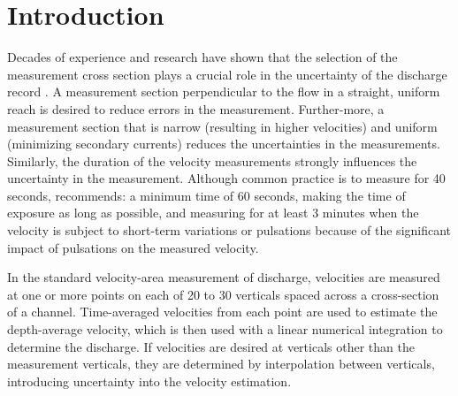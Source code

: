 \documentclass[Journal,letterpaper,BackFigs]{ascelike-new}
\begin{document}
\section{Introduction}
Decades of experience and research have shown that the selection of the measurement cross section plays a crucial role in the uncertainty of the discharge record \cite{Herschy:2009}. A measurement section perpendicular to the flow in a straight, uniform reach is desired to reduce errors in the measurement. Further-more, a measurement section that is narrow (resulting in higher velocities) and uniform (minimizing secondary currents) reduces the uncertainties in the measurements. Similarly, the duration of the velocity measurements strongly influences the uncertainty in the measurement. Although common practice is to measure for 40 seconds,  recommends: a minimum time of 60 seconds, making the time of exposure as long as possible, and measuring for at least 3 minutes when the velocity is subject to short-term variations or pulsations because of the significant impact of pulsations on the measured velocity.

In the standard velocity-area measurement of discharge, velocities are measured at one or more points on each of 20 to 30 verticals spaced across a cross-section of a channel. Time-averaged velocities from each point are used to estimate the depth-average velocity, which is then used with a linear numerical integration to determine the discharge. If velocities are desired at verticals other than the measurement verticals, they are determined by interpolation between verticals, introducing uncertainty into the velocity estimation.
\end{document}
